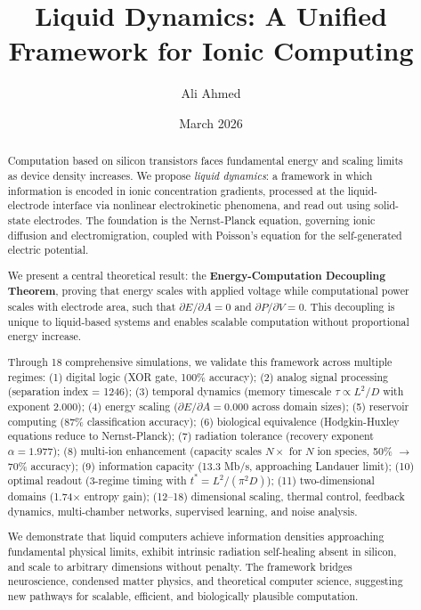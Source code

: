 \documentclass[11pt]{article}
\title{Liquid Dynamics: A Unified Framework for Ionic Computing}
\author{Ali Ahmed}
\date{March 2026}
\begin{document}
\maketitle

\begin{abstract}

Computation based on silicon transistors faces fundamental energy and scaling limits as device density increases. We propose \textit{liquid dynamics}: a framework in which information is encoded in ionic concentration gradients, processed at the liquid-electrode interface via nonlinear electrokinetic phenomena, and read out using solid-state electrodes. The foundation is the Nernst-Planck equation, governing ionic diffusion and electromigration, coupled with Poisson's equation for the self-generated electric potential.

We present a central theoretical result: the \textbf{Energy-Computation Decoupling Theorem}, proving that energy scales with applied voltage while computational power scales with electrode area, such that $\partial E/\partial A = 0$ and $\partial P/\partial V = 0$. This decoupling is unique to liquid-based systems and enables scalable computation without proportional energy increase.

Through 18 comprehensive simulations, we validate this framework across multiple regimes: (1) digital logic (XOR gate, 100\% accuracy); (2) analog signal processing (separation index = 1246); (3) temporal dynamics (memory timescale $\tau \propto L^2/D$ with exponent 2.000); (4) energy scaling ($\partial E/\partial A = 0.000$ across domain sizes); (5) reservoir computing (87\% classification accuracy); (6) biological equivalence (Hodgkin-Huxley equations reduce to Nernst-Planck); (7) radiation tolerance (recovery exponent $\alpha = 1.977$); (8) multi-ion enhancement (capacity scales $N \times$ for $N$ ion species, 50\% $\to$ 70\% accuracy); (9) information capacity (13.3 Mb/s, approaching Landauer limit); (10) optimal readout (3-regime timing with $t^* = L^2/(\pi^2 D)$); (11) two-dimensional domains (1.74$\times$ entropy gain); (12–18) dimensional scaling, thermal control, feedback dynamics, multi-chamber networks, supervised learning, and noise analysis.

We demonstrate that liquid computers achieve information densities approaching fundamental physical limits, exhibit intrinsic radiation self-healing absent in silicon, and scale to arbitrary dimensions without penalty. The framework bridges neuroscience, condensed matter physics, and theoretical computer science, suggesting new pathways for scalable, efficient, and biologically plausible computation.

\end{abstract}
\end{document}
